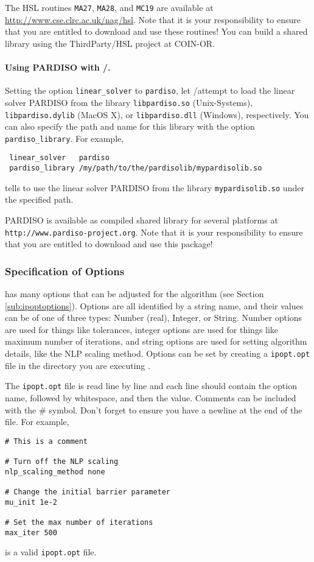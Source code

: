 The HSL routines \texttt{MA27}, \texttt{MA28}, and \texttt{MC19} are available at \url{http://www.cse.clrc.ac.uk/nag/hsl}.
Note that it is your responsibility to ensure that you are entitled to download and use these routines!
You can build a shared library using the ThirdParty/HSL project at COIN-OR.

\paragraph{Using PARDISO with \MYGAMS/\IPOPT.}
Setting the option \texttt{linear\_solver} to \texttt{pardiso}, let \MYGAMS/\IPOPT attempt to load the linear solver PARDISO from the library \texttt{libpardiso.so} (Unix-Systems), \texttt{libpardiso.dylib} (MacOS X), or \texttt{libpardiso.dll} (Windows), respectively.
You can also specify the path and name for this library with the option \texttt{pardiso\_library}.
For example,
\begin{verbatim}
 linear_solver   pardiso
 pardiso_library /my/path/to/the/pardisolib/mypardisolib.so
\end{verbatim}
tells \IPOPT to use the linear solver PARDISO from the library \texttt{mypardisolib.so} under the specified path.

PARDISO is available as compiled shared library for several platforms at \texttt{http://www.pardiso-project.org}.
Note that it is your responsibility to ensure that you are entitled to download and use this package!


\subsubsection{Specification of Options}
\label{sub:ipoptoptionspec}

\IPOPT has many options that can be adjusted for the algorithm (see Section \ref{sub:ipoptoptions}).
Options are all identified by a string name, and their values can be of one of three types: Number (real), Integer, or String.
Number options are used for things like tolerances, integer options are used for things like maximum number of iterations, and string options are used for setting algorithm details, like the NLP scaling method.
Options can be set by creating a \texttt{ipopt.opt} file in the directory you are executing \IPOPT.

The \texttt{ipopt.opt} file is read line by line and each line should contain the option name, followed by whitespace, and then the value.
Comments can be included with the \# symbol. Don't forget to ensure you have a newline at the end of the file. For example,
\begin{verbatim}
# This is a comment

# Turn off the NLP scaling
nlp_scaling_method none

# Change the initial barrier parameter
mu_init 1e-2

# Set the max number of iterations
max_iter 500
\end{verbatim}
is a valid \texttt{ipopt.opt} file.

